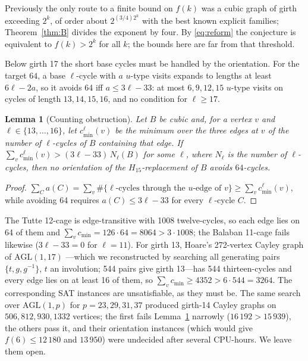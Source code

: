 \documentclass[11pt]{article}
\newtheorem{lemma}[theorem]{Lemma}
\theoremstyle{remark}
\theoremstyle{definition}
\begin{document}
Previously the only route to a finite bound on $f(k)$ was a cubic graph of girth exceeding $2^k$, of order about $2^{(3/4)2^k}$ with the best known explicit families; Theorem~\ref{thm:B} divides the exponent by four. By \eqref{eq:reform} the conjecture is equivalent to $f(k)>2^k$ for all $k$; the bounds here are far from that threshold.

Below girth 17 the short base cycles must be handled by the orientation. For the target $64$, a base $\ell$-cycle with $a$ $u$-type visits expands to lengths at least $6\ell-2a$, so it avoids 64 iff $a\le 3\ell-33$: at most $6,9,12,15$ $u$-type visits on cycles of length $13,14,15,16$, and no condition for $\ell\ge 17$.

\begin{lemma}[Counting obstruction]\label{lem:count}
Let $B$ be cubic and, for a vertex $v$ and $\ell\in\{13,\dots,16\}$, let $c^{\ell}_{\min}(v)$ be the minimum over the three edges at $v$ of the number of $\ell$-cycles of $B$ containing that edge. If $\sum_v c^{\ell}_{\min}(v)>(3\ell-33)\,N_\ell(B)$ for some $\ell$, where $N_\ell$ is the number of $\ell$-cycles, then no orientation of the $H_{15}$-replacement of $B$ avoids $64$-cycles.
\end{lemma}

\begin{proof}
$\sum_C a(C)=\sum_v\#\{\ell\text{-cycles through the $u$-edge of }v\}\ge\sum_v c^{\ell}_{\min}(v)$, while avoiding 64 requires $a(C)\le 3\ell-33$ for every $\ell$-cycle $C$.
\end{proof}

The Tutte 12-cage is edge-transitive with 1008 twelve-cycles, so each edge lies on 64 of them and $\sum_v c_{\min}=126\cdot 64=8064>3\cdot 1008$; the Balaban 11-cage fails likewise ($3\ell-33=0$ for $\ell=11$). For girth 13, Hoare's 272-vertex Cayley graph of $\mathrm{AGL}(1,17)$ \cite{ExooJajcay}---which we reconstructed by searching all generating pairs $\{t,g,g^{-1}\}$, $t$ an involution; 544 pairs give girth 13---has 544 thirteen-cycles and every edge lies on at least 16 of them, so $\sum_v c_{\min}\ge 4352>6\cdot 544=3264$. The corresponding SAT instances are unsatisfiable, as they must be. The same search over $\mathrm{AGL}(1,p)$ for $p=23,29,31,37$ produced girth-14 Cayley graphs on $506,812,930,1332$ vertices; the first fails Lemma~\ref{lem:count} narrowly ($16\,192>15\,939$), the others pass it, and their orientation instances (which would give $f(6)\le 12\,180$ and $13\,950$) were undecided after several CPU-hours. We leave them open.
\end{document}

